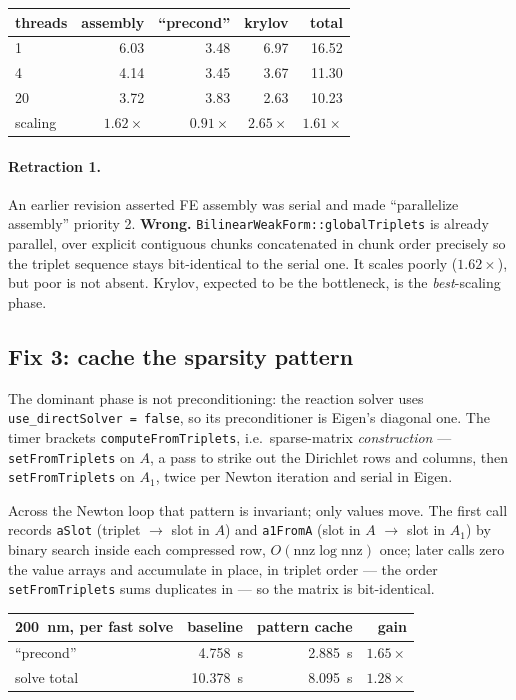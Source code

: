 \documentclass[11pt]{article}
\begin{document}
\begin{center}
\begin{tabular}{lrrrr}
\toprule
threads & assembly & ``precond'' & krylov & total\\
\midrule
1 & 6.03 & 3.48 & 6.97 & 16.52\\
4 & 4.14 & 3.45 & 3.67 & 11.30\\
20 & 3.72 & 3.83 & 2.63 & 10.23\\
\midrule
scaling & $1.62\times$ & \cellcolor{red!15}$\mathbf{0.91\times}$ & $2.65\times$ & $1.61\times$\\
\bottomrule
\end{tabular}
\end{center}

\paragraph{Retraction 1.} An earlier revision asserted FE assembly was serial
and made ``parallelize assembly'' priority 2. \textbf{Wrong.}
\texttt{BilinearWeakForm::globalTriplets} is already parallel, over explicit
contiguous chunks concatenated in chunk order precisely so the triplet
sequence stays bit-identical to the serial one. It scales poorly
($1.62\times$), but poor is not absent. Krylov, expected to be the bottleneck,
is the \emph{best}-scaling phase.

\subsection{Fix 3: cache the sparsity pattern}
The dominant phase is not preconditioning: the reaction solver uses
\texttt{use\_directSolver = false}, so its preconditioner is Eigen's diagonal
one. The timer brackets \texttt{computeFromTriplets}, i.e.\ sparse-matrix
\emph{construction} --- \texttt{setFromTriplets} on $A$, a pass to strike out
the Dirichlet rows and columns, then \texttt{setFromTriplets} on $A_1$, twice
per Newton iteration and serial in Eigen.

Across the Newton loop that pattern is invariant; only values move. The first
call records \texttt{aSlot} (triplet $\rightarrow$ slot in $A$) and
\texttt{a1FromA} (slot in $A$ $\rightarrow$ slot in $A_1$) by binary search
inside each compressed row, $O(\mathrm{nnz}\log\mathrm{nnz})$ once; later calls
zero the value arrays and accumulate in place, in triplet order --- the order
\texttt{setFromTriplets} sums duplicates in --- so the matrix is bit-identical.

\begin{center}
\begin{tabular}{lrrr}
\toprule
\SI{200}{\nano\meter}, per fast solve & baseline & pattern cache & gain\\
\midrule
``precond'' & \SI{4.758}{\second} & \SI{2.885}{\second} & $1.65\times$\\
solve total & \SI{10.378}{\second} & \SI{8.095}{\second} & $1.28\times$\\
\bottomrule
\end{tabular}
\end{center}
\end{document}
